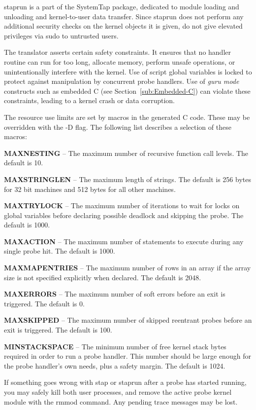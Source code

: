 \documentclass[twoside,english]{article}
\begin{document}
staprun is a part of the SystemTap package, dedicated to module loading and
unloading and kernel-to-user data transfer. Since staprun does not perform
any additional security checks on the kernel objects it is given, do not
give elevated privileges via sudo to untrusted users.

The translator asserts certain safety constraints. It
ensures that no handler routine can run for too long, allocate memory, perform
unsafe operations, or unintentionally interfere with the kernel. Use of script
global variables is locked to protect against manipulation by concurrent
probe handlers. Use of \emph{guru mode} constructs such as embedded C (see
Section~\ref{sub:Embedded-C}) can violate these constraints, leading to
a kernel crash or data corruption.

The resource use limits are set by macros in the generated C code. These
may be overridden with the -D flag. The following list describes a selection
of these macros:

\textbf{MAXNESTING} -- The maximum number of recursive function call levels. The default is 10.

\textbf{MAXSTRINGLEN} -- The maximum length of strings. The default is 256 bytes
for 32 bit machines and 512 bytes for all other machines.

\textbf{MAXTRYLOCK} -- The maximum number of iterations to wait for locks on global variables before
declaring possible deadlock and skipping the probe. The default is 1000.

\textbf{MAXACTION} -- The maximum number of statements to execute during any single probe hit. The default is 1000.

\textbf{MAXMAPENTRIES} -- The maximum number of rows in an array if the array size is not specified
explicitly when declared. The default is 2048.

\textbf{MAXERRORS} -- The maximum number of soft errors before an exit is triggered. The default is 0.

\textbf{MAXSKIPPED} -- The maximum number of skipped reentrant probes before an exit is triggered. The default is 100.

\textbf{MINSTACKSPACE} -- The minimum number of free kernel stack bytes required in order to run a
probe handler. This number should be large enough for the probe handler's
own needs, plus a safety margin.  The default is 1024.

If something goes wrong with stap or staprun after a probe has started running,
you may safely kill both user processes, and remove the active probe kernel
module with the rmmod command. Any pending trace messages may be lost.
\end{document}

